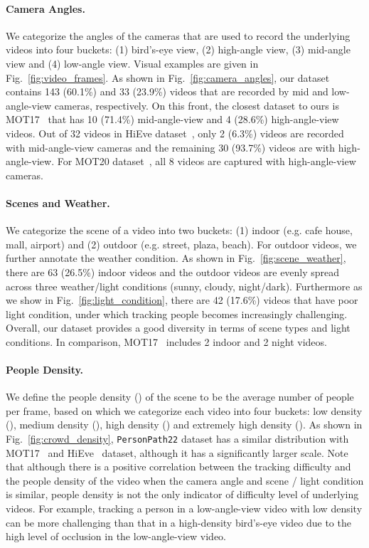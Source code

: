 \documentclass[runningheads]{llncs}
\begin{document}
\paragraph{\textbf{Camera Angles.}} We categorize the angles of the cameras that are used to record the underlying videos into four buckets: (1) bird's-eye view, (2) high-angle view, (3) mid-angle view and (4) low-angle view. Visual examples are given in Fig.~\ref{fig:video_frames}.
As shown in Fig.~\ref{fig:camera_angles}, our dataset contains 143 (60.1\%) and 33 (23.9\%) videos that are recorded by mid and low-angle-view cameras, respectively. On this front, the closest dataset to ours is MOT17~\cite{mot} that has 10 (71.4\%) mid-angle-view and 4 (28.6\%) high-angle-view videos. Out of 32 videos in HiEve dataset~\cite{hieve}, only 2 (6.3\%) videos are recorded with mid-angle-view cameras and the remaining 30 (93.7\%) videos are with high-angle-view. For MOT20 dataset~\cite{mot20}, all 8 videos are captured with high-angle-view cameras.

\paragraph{\textbf{Scenes and Weather.}} We categorize the scene of a video into two buckets: (1) indoor (e.g. cafe house, mall, airport) and (2) outdoor (e.g. street, plaza, beach). For outdoor videos, we further annotate the weather condition. As shown in Fig.~\ref{fig:scene_weather}, there are 63 (26.5\%) indoor videos and the outdoor videos are evenly spread across three weather/light conditions (sunny, cloudy, night/dark). Furthermore as we show in Fig.~\ref{fig:light_condition}, there are 42 (17.6\%) videos that have poor light condition, under which tracking people becomes increasingly challenging. Overall, our dataset provides a good diversity in terms of scene types and light conditions.  In comparison, MOT17~\cite{mot} includes 2 indoor and 2 night videos.


\paragraph{\textbf{People Density.}} We define the people density () of the scene to be the average number of people per frame, based on which we categorize each video into four buckets: low density (), medium density (), high density () and extremely high density (). As shown in Fig.~\ref{fig:crowd_density}, \texttt{PersonPath22} dataset has a similar distribution with MOT17~\cite{mot} and HiEve~\cite{hieve} dataset, although it has a significantly larger scale.
Note that although there is a positive correlation between the tracking difficulty and the people density of the video when the camera angle and scene / light condition is similar, people density is not the only indicator of difficulty level of underlying videos. For example, tracking a person in a low-angle-view video with low density can be more challenging than that in a high-density bird's-eye video due to the high level of occlusion in the low-angle-view video.
\end{document}
